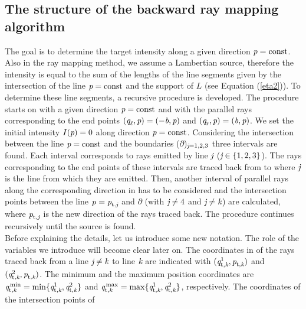 \subsection{The structure of the backward ray mapping algorithm}\label{sec:algorithm_raymapping}
The goal is to determine the target intensity along a given direction $\textit{p}=\textrm{const}$.
Also in the ray mapping method, we assume a Lambertian source, therefore the intensity is equal to the sum of the lengths of the line segments given by the intersection of the line $\textit{p} = \mbox{const}$ and the support of $L$ (see Equation (\ref{eta2})).
To determine these line segments, a recursive procedure is developed.
The procedure starts on  with a given direction $\textit{p} = \mbox{const}$ and with the parallel rays corresponding to the end points $(\textit{q}_{\ell}, \textit{p}) = (-\textit{b}, \textit{p})$ and $(\textit{q}_{\textrm{r}}, \textit{p}) = (\textit{b}, \textit{p})$. 
We set the initial intensity $I(\textit{p})=0$ along direction $\textit{p} = \mbox{const}$. 
Considering the intersection between the line $\textit{p}=\textrm{const}$ and the boundaries ($\partial$)$_{\textit{j}=1,2,3}$ three intervals are found.
Each interval corresponds to rays emitted by line $\textit{j}$ ($\textit{j}\in\{1,2,3\}$).
The rays corresponding to the end points of these intervals are traced back from  to  where $\textit{j}$ is the line from which
they are emitted. Then, another interval of parallel rays along the corresponding direction in  has to be considered and the intersection points between the line $\textit{p}_{\textrm{} \textit{}} = \textit{p}_{\textrm{t,} \textit{\textit{j}}}$ and $\partial$ (with $\textit{j}\neq4$ and $\textit{j}\neq\textit{k}$) are calculated, where $\textit{p}_{\textrm{t,} \textit{\textit{j}}}$ is the new direction of the rays traced back.
The procedure continues recursively until the source is found. 
\\ \indent Before explaining the details, let us introduce some new notation. The role of the variables we introduce will become clear later on.
The coordinates in  of the rays traced back from a line $\textit{j}\neq\textit{k}$ to
line $\textit{k}$ are indicated with $(\textit{q}_{\textrm{t,} \textit{\textit{k}}}^1, \textit{p}_{\textrm{t,} \textit{\textit{k}}})$ and $(\textit{q}_{\textrm{t,} \textit{\textit{k}}}^2, \textit{p}_{\textrm{t,} \textit{\textit{k}}})$.
The minimum and the maximum position coordinates are $\textit{q}_{\textrm{t,} \textit{\textit{k}}}^\textrm{\,min} = \min\{\textit{q}_{\textrm{t,} \textit{\textit{k}}}^1, \textit{q}_{\textrm{t,} \textit{\textit{k}}}^2\}$ and 
$\textit{q}_{\textrm{t,} \textit{\textit{k}}}^\textrm{\,max} = \max\{\textit{q}_{\textrm{t,} \textit{\textit{k}}}^1, \textit{q}_{\textrm{t,} \textit{\textit{k}}}^2\}$, respectively. The coordinates of the intersection points of
